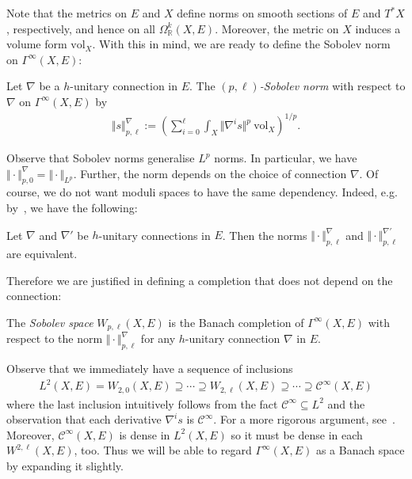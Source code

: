 \documentclass[12pt]{ociamthesis}  %
\begin{document}
Note that the metrics on $E$ and $X$ define norms on smooth sections
of $E$ and $T^*X$, respectively, and hence on all
$\Omega^k_{\mathbb{R}}(X,E)$.
Moreover, the metric on $X$ induces a volume form $\text{vol}_X$.
With this in mind, we are ready to define the Sobolev norm on
$\Gamma^\infty(X,E)$:

\begin{definition}
  Let $\nabla$ be a $h$-unitary connection in $E$.
  The \emph{$(p,\ell)$-Sobolev norm} with respect to $\nabla$ on
  $\Gamma^\infty(X,E)$ by
  \begin{align*}
    \Vert s\Vert_{p,\ell}^\nabla := \left(
    \sum_{i=0}^\ell \int_X \Vert \nabla^i s \Vert^p\:\text{vol}_X
    \right)^{1/p}.
  \end{align*}
\end{definition}

Observe that Sobolev norms generalise $L^p$ norms. In particular,
we have $\Vert\cdot\Vert^\nabla_{p,0} = \Vert\cdot\Vert_{L^p}$.
Further, the norm depends on the choice of connection $\nabla$. Of
course, we do not want moduli spaces to have the same dependency.
Indeed, e.g. by~\cite[Corollary 7.3]{shubin2001}, we have the following:
\begin{lemma}
  Let $\nabla$ and $\nabla'$ be $h$-unitary connections in $E$. Then the
  norms $\Vert\cdot\Vert_{p,\ell}^\nabla$ and
  $\Vert\cdot\Vert_{p,\ell}^{\nabla'}$ are equivalent.
\end{lemma}

Therefore we are justified in defining a completion that does not depend
on the connection:

\begin{definition}
  The \emph{Sobolev space} $W_{p,\ell}(X,E)$ is the Banach completion of
  $\Gamma^\infty(X,E)$ with respect to the norm
  $\Vert\cdot\Vert_{p,\ell}^\nabla$ for any $h$-unitary connection
  $\nabla$ in $E$.
\end{definition}

Observe that we immediately have a sequence of inclusions
\begin{align*}
  L^2(X,E) =
  W_{2,0}(X,E) \supseteq
  \cdots \supseteq
  W_{2,\ell}(X,E) \supseteq
  \cdots
  \supseteq
  \mathscr C^\infty(X,E)
\end{align*}
where the last inclusion intuitively follows from the fact
$\mathscr C^\infty \subseteq L^2$ and the observation that each derivative
$\nabla^i s$ is $\mathscr C^\infty$. For a more rigorous argument, see~\cite[Corollary 3.8.3]{bc2009}.
Moreover, $\mathscr C^\infty(X,E)$ is dense in $L^2(X,E)$ so it must be dense in each
$W^{2,\ell}(X,E)$, too. Thus we will be able to regard $\Gamma^\infty(X,E)$
as a Banach space by expanding it slightly.
\end{document}
